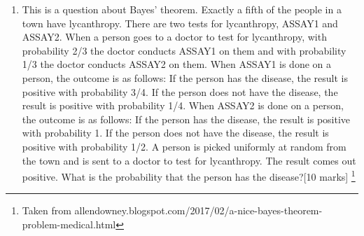 \documentclass[11pt,a4paper]{scrartcl}
\newif\ifanswers
\begin{document}
\begin{enumerate}
\begin{enumerate}
\end{enumerate}
  
\ifanswers
\textbf{Answer}:\\
  \textbf{a)} So there are 36 possible pairs of face values, each equally likes, of these 6+1, 5+2, 4+3, 3+4, 2+5 and 1+6 add to seven, so the probability of rolling a seven is 1/6.\\
  \textbf{b)} win is 1/6+1/18 since there are two ways to make 11: 5+6 and 6+5, this is 4/18=2/9. lose is 1/36+1/18+1/36 which is 1/9 and by subtraction this leave 2/3 as the chance of going on to the next phase of the game.\\
  \textbf{c)} So using Bayes rule
  \begin{equation}
    P(4|4\|7)=\frac{P(4\|7|4)P(4)}{P(4\|7)}
  \end{equation}
  with $P(4)=3/36$ and $P(7)=6/36$ and $P(4\|7|4)=1$ hence
  \begin{equation}
    P(4|4\|7)=3/(3+6)=1/3
  \end{equation}
  \textbf{d)} There are two ways of winning, either from the come out roll or a subsequent roll, which must be summed over the possible point values. 
  \begin{equation}
    P(\mbox{first roll is 11 or seven})+\sum_{4,5,6,8,9,10} P_iQ_i=\frac{2}{9}+\sum_{4,5,6,8,9,10} P_iQ_i
  \end{equation}
  \textbf{e)} So
  \begin{equation}
    \frac{2}{9}+\frac{1}{3}\frac{1}{12}+\frac{2}{5}\frac{1}{9}+\frac{5}{11}\frac{5}{36}+\frac{5}{11}\frac{5}{36}+\frac{2}{5}\frac{1}{9}+\frac{1}{3}\frac{1}{12}\approx 0.49
  \end{equation}
[each part has 4 marks with 4 for completely correct, 3 for correct with numerical error, 2 for right idea but not implemented, 1 for some idea].
  \fi
  
\item This is a question about Bayes' theorem.  Exactly a fifth of the
  people in a town have lycanthropy. There are two tests for
  lycanthropy, ASSAY1 and ASSAY2. When a person goes to a doctor
  to test for lycanthropy, with probability 2/3 the doctor conducts
  ASSAY1 on them and with probability 1/3 the doctor conducts ASSAY2
  on them. When ASSAY1 is done on a person, the outcome is as follows:
  If the person has the disease, the result is positive with
  probability 3/4. If the person does not have the disease, the result
  is positive with probability 1/4. When ASSAY2 is done on a person,
  the outcome is as follows: If the person has the disease, the result
  is positive with probability 1. If the person does not have the
  disease, the result is positive with probability 1/2. A person is
  picked uniformly at random from the town and is sent to a doctor to
  test for lycanthropy. The result comes out positive. What is the
  probability that the person has the disease?[10 marks] \footnote{Taken from allendowney.blogspot.com/2017/02/a-nice-bayes-theorem-problem-medical.html}


\end{enumerate}
\end{document}
